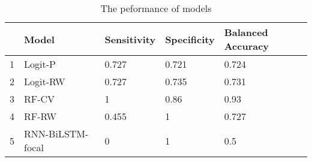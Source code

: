 \begin{table}[ht]
\centering
\begin{tabular}{rllll}
  \hline
 & Model & Sensitivity & Specificity & Balanced Accuracy \\ 
  \hline
1 & Logit-P & 0.727 & 0.721 & 0.724 \\ 
  2 & Logit-RW & 0.727 & 0.735 & 0.731 \\ 
  3 & RF-CV & 1 & 0.86 & 0.93 \\ 
  4 & RF-RW & 0.455 & 1 & 0.727 \\ 
  5 & RNN-BiLSTM-focal & 0 & 1 & 0.5 \\ 
   \hline
\end{tabular}
\caption{The peformance of models} 
\label{tab:res}
\end{table}
